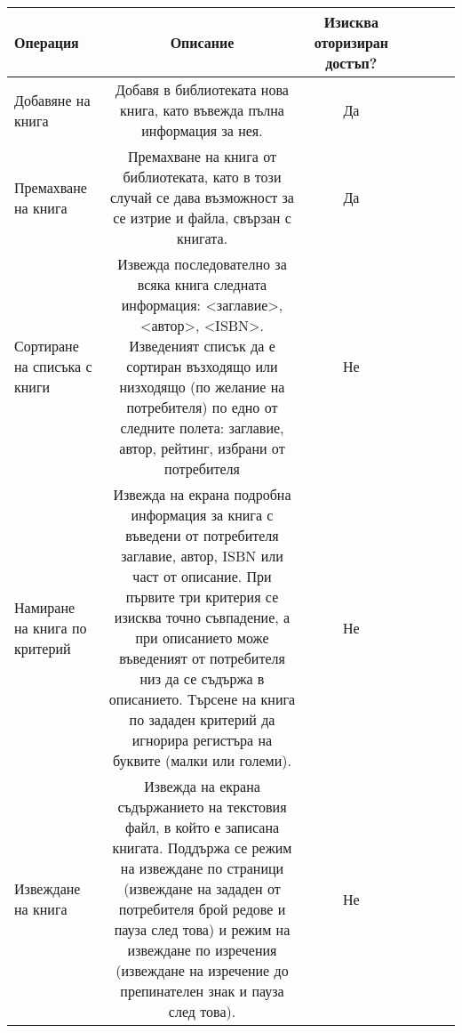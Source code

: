 \begin{table}[!ht]
    \begin{tabular}{lcccccc}
        \toprule
        \textbf{Операция}             & \textbf{Описание}                                                                                                                                                                                                                                                                                                                                    & \textbf{Изисква оторизиран достъп?} \\ \midrule
        Добавяне на книга             & Добавя в библиотеката нова книга, като въвежда пълна информация за нея.                                                                                                                                                                                                                                                                              & Да                                  \\
        Премахване на книга           & Премахване на книга от библиотеката, като в този случай се дава възможност за се изтрие и файла, свързан с книгата.                                                                                                                                                                                                                                  & Да                                  \\
        Сортиране на списъка с книги  & Извежда последователно за всяка книга следната информация: \textless{}заглавие\textgreater{}, \textless{}автор\textgreater{}, \textless{}ISBN\textgreater{}. Изведеният списък да е сортиран възходящо или низходящо (по желание на потребителя) по едно от следните полета: заглавие, автор, рейтинг, избрани от потребителя                        & Не                                  \\
        Намиране на книга по критерий & Извежда на екрана подробна информация за книга с въведени от потребителя заглавие, автор, ISBN или част от описание. При първите три критерия се изисква точно съвпадение, а при описанието може въведеният от потребителя низ да се съдържа в описанието. Търсене на книга по зададен критерий да игнорира регистъра на буквите (малки или големи). & Не                                  \\
        Извеждане на книга            & Извежда на екрана съдържанието на текстовия файл, в който е записана книгата. Поддържа се режим на извеждане по страници (извеждане на зададен от потребителя брой редове и пауза след това) и режим на извеждане по изречения (извеждане на изречение до препинателен знак и пауза след това).                                                      & Не                                  \\ \bottomrule
    \end{tabular}
\end{table}